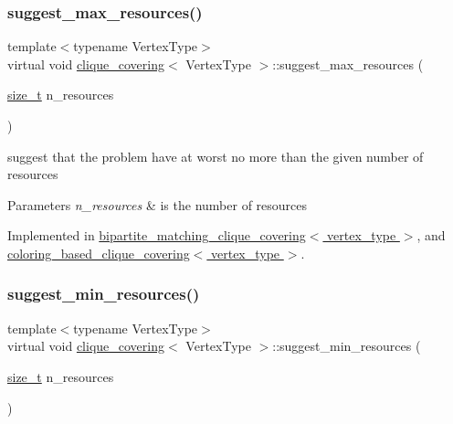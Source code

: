 \subsubsection{\texorpdfstring{suggest\+\_\+max\+\_\+resources()}{suggest\_max\_resources()}}
{\footnotesize\ttfamily template$<$typename Vertex\+Type$>$ \\
virtual void \hyperlink{classclique__covering}{clique\+\_\+covering}$<$ Vertex\+Type $>$\+::suggest\+\_\+max\+\_\+resources (\begin{DoxyParamCaption}\item[{\hyperlink{tutorial__fpt__2017_2intro_2sixth_2test_8c_a7c94ea6f8948649f8d181ae55911eeaf}{size\+\_\+t}}]{n\+\_\+resources }\end{DoxyParamCaption})\hspace{0.3cm}{\ttfamily [pure virtual]}}



suggest that the problem have at worst no more than the given number of resources 


\begin{DoxyParams}{Parameters}
{\em n\+\_\+resources} & is the number of resources \\
\hline
\end{DoxyParams}


Implemented in \hyperlink{classbipartite__matching__clique__covering_a80332109220a9bb4d8a599a5eed97c90}{bipartite\+\_\+matching\+\_\+clique\+\_\+covering$<$ vertex\+\_\+type $>$}, and \hyperlink{classcoloring__based__clique__covering_a8ebd9dc934acf7724e6793398991ad94}{coloring\+\_\+based\+\_\+clique\+\_\+covering$<$ vertex\+\_\+type $>$}.

\mbox{\label{classclique__covering_aaf503ea280de45beb314149704414922}} 
\subsubsection{\texorpdfstring{suggest\+\_\+min\+\_\+resources()}{suggest\_min\_resources()}}
{\footnotesize\ttfamily template$<$typename Vertex\+Type$>$ \\
virtual void \hyperlink{classclique__covering}{clique\+\_\+covering}$<$ Vertex\+Type $>$\+::suggest\+\_\+min\+\_\+resources (\begin{DoxyParamCaption}\item[{\hyperlink{tutorial__fpt__2017_2intro_2sixth_2test_8c_a7c94ea6f8948649f8d181ae55911eeaf}{size\+\_\+t}}]{n\+\_\+resources }\end{DoxyParamCaption})\hspace{0.3cm}{\ttfamily [pure virtual]}}



